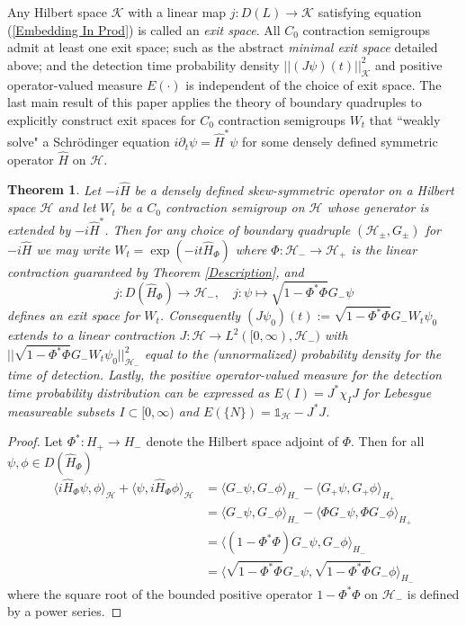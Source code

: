 \documentclass{article}
\numberwithin{equation}{section}
\newtheorem{theoremmainagain}{Theorem}
\begin{document}
Any Hilbert space $\mathcal{K}$ with a linear map $j:D(L) \to \mathcal{K}$ satisfying equation (\ref{Embedding In Prod}) is called an \textit{exit space}. All $C_0$ contraction semigroups admit at least one exit space; such as the abstract \textit{minimal exit space} detailed above; and the detection time probability density $||(J\psi)(t)||_{\mathcal{K}}^2$ and positive operator-valued measure $E(\cdot)$ is independent of the choice of exit space. The last main result of this paper applies the theory of boundary quadruples to explicitly construct exit spaces for $C_0$ contraction semigroups $W_t$ that ``weakly solve" a Schr\"odinger equation $i\partial_t \psi=\hat{H}^*\psi$ for some densely defined symmetric operator $\hat{H}$ on $\mathcal{H}$.
\begin{theoremmainagain}
    Let $-i\hat{H}$ be a densely defined skew-symmetric operator on a Hilbert space $\mathcal{H}$ and let $W_t$ be a $C_0$ contraction semigroup on $\mathcal{H}$ whose generator is extended by $-i\hat{H}^*$. Then for any choice of boundary quadruple $(\mathcal{H}_\pm,G_\pm)$ for $-i\hat{H}$ we may write $W_t=\exp(-it\hat{H}_\Phi)$ where $\Phi:\mathcal{H}_-\to\mathcal{H}_+$ is the linear contraction guaranteed by Theorem \ref{Description}, and \begin{equation}
        j:D(\hat{H}_\Phi)\to \mathcal{H}_-, \quad j:\psi \mapsto \sqrt{1-\Phi^*\Phi}G_-\psi
    \end{equation} 
    defines an exit space for $W_t$. Consequently $(J\psi_0)(t):=\sqrt{1-\Phi^*\Phi}G_-W_t\psi_0$ extends to a linear contraction $J:\mathcal{H}\to L^2([0,\infty),\mathcal{H}_-)$ with $||\sqrt{1-\Phi^*\Phi}G_-W_t\psi_0||_{\mathcal{H}_-}^2$ equal to the (unnormalized) probability density for the time of detection. Lastly, the positive operator-valued measure for the detection time probability distribution can be expressed as $E(I)=J^*\chi_IJ$ for Lebesgue measureable subsets $I\subset [0,\infty)$ and $E(\{N\})=\mathds{1}_\mathcal{H}-J^*J$.
\end{theoremmainagain}

\begin{proof}
    Let $\Phi^*:H_+ \to H_-$ denote the Hilbert space adjoint of $\Phi$. Then for all $\psi, \phi \in D(\hat{H}_\Phi)$ 
    \begin{equation}
    \begin{split}
        \langle i\hat{H}_\Phi \psi, \phi \rangle_{\mathcal{H}}+\langle \psi, i\hat{H}_\Phi \phi \rangle_{\mathcal{H}} &= \langle G_-\psi, G_- \phi \rangle_{H_-}- \langle G_+ \psi, G_+\phi \rangle_{H_+}
        \\
        &= \langle G_-\psi, G_- \phi \rangle_{H_-}- \langle \Phi G_- \psi, \Phi G_-\phi \rangle_{H_+}
        \\
        &= \langle (1- \Phi^* \Phi)G_-\psi, G_- \phi \rangle_{H_-}
        \\
        &= \langle \sqrt{1- \Phi^* \Phi}G_-\psi, \sqrt{1-\Phi^* \Phi} G_- \phi \rangle_{H_-}
    \end{split}
    \end{equation}
    where the square root of the bounded positive operator $1-\Phi^*\Phi$ on $\mathcal{H}_-$ is defined by a power series.
\end{proof}
\end{document}
